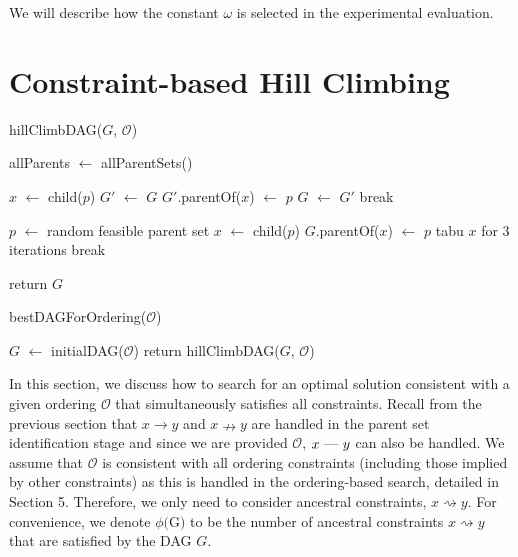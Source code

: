 \documentclass[twoside,11pt]{article}
\begin{document}
\medskip
We will describe how the constant $\omega$ is selected in the experimental evaluation.


\section{Constraint-based Hill Climbing}
\label{SECTION:ConstraintBasedHillClimbing}

\begin{algorithm}[t]
	\caption{hillClimbDAG($G$, $\mathcal{O}$)}
 		allParents $\leftarrow$ allParentSets()  
		
		 {
			 {
				$x$ $\leftarrow$ child($p$) \;
				 {
					$G'$ $\leftarrow$ $G$\;
					$G'$.parentOf($x$) $\leftarrow$ $p$ \;
					 {
						$G$ $\leftarrow$ $G'$ \;
						break \;
					}
				}
			}
			
			 {
				 { 
					$p$ $\leftarrow$ random feasible parent set\;
					$x$ $\leftarrow$ child($p$) \;
					$G$.parentOf($x$) $\leftarrow$ $p$ \;
					tabu $x$ for $3$ iterations \;
				}
				 {
					break \;
				}
			}
			
		}
	
	return $G$ \;
\end{algorithm}


\begin{algorithm}[t]
	\caption{bestDAGForOrdering($\mathcal{O}$)}
 		$G$ $\leftarrow$ initialDAG($\mathcal{O}$) \;
		return hillClimbDAG($G$, $\mathcal{O}$) \;
\end{algorithm}


In this section, we discuss how to search for an optimal solution consistent with a given ordering $\mathcal{O}$ that simultaneously satisfies all constraints. Recall from the previous
section that  $x \rightarrow y$ and $x \nrightarrow y$ are handled in the parent set identification stage and since we are provided $\mathcal{O}$, 
$x \text{ \textemdash \  } y$ can also be handled. We assume that $\mathcal{O}$ is consistent with all ordering constraints (including those implied
by other constraints) as this is handled in the ordering-based search, detailed in Section 5. Therefore, we only need to consider ancestral constraints, $x \rightsquigarrow y$.
For convenience, we denote $\phi($G$)$ to be the number of ancestral constraints $x \rightsquigarrow y$ that are satisfied by the DAG $G$.
\end{document}
